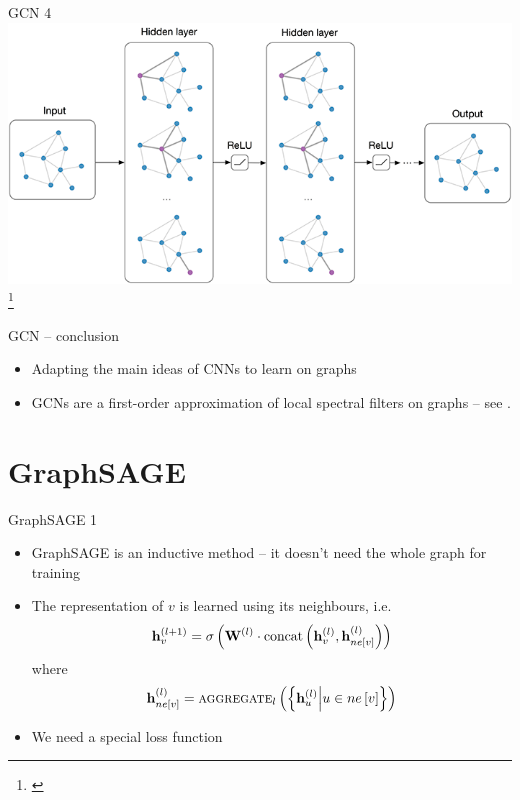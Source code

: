 \documentclass[10pt]{beamer}
\newcommand{\mathvec}{\ensuremath{\mathbf}}
\newcommand{\mathmat}{\ensuremath{\mathbf}}
\begin{document}
\begin{frame}{GCN 4}
	\centering
	\includegraphics[width=0.8\pagewidth]{images/GCN.png}\footnote{\cite{kipf_how_2016}}
\end{frame}

\begin{frame}{GCN -- conclusion}
	\begin{itemize}
		\item Adapting the main ideas of CNNs to learn on graphs
		\item GCNs are a first-order approximation of local spectral filters on graphs -- see \cite{kipf_semi-supervised_2017}.
	\end{itemize}
\end{frame}

\section{GraphSAGE}

\begin{frame}{GraphSAGE 1}
	\begin{itemize}
		\item GraphSAGE is an inductive method -- it doesn't need the whole graph for training
		\item The representation of \( v \) is learned using its neighbours, i.e.
			\[ \mathvec{h}_v^{(l + 1)} = \sigma \left( \mathmat{W}^{(l)} \cdot \mathrm{concat} \left( \mathvec{h}_v^{(l)}, \mathvec{h}_{ne \left[ v \right]}^{(l)} \right) \right) \]
			where
			\[ \mathvec{h}_{ne \left[ v \right]}^{(l)} = \textsc{aggregate}_l \left( \left\{ \mathvec{h}_u^{(l)} \middle| u \in ne \left[ v \right] \right\} \right) \]
		\item We need a special loss function
	\end{itemize}
\end{frame}
\end{document}
